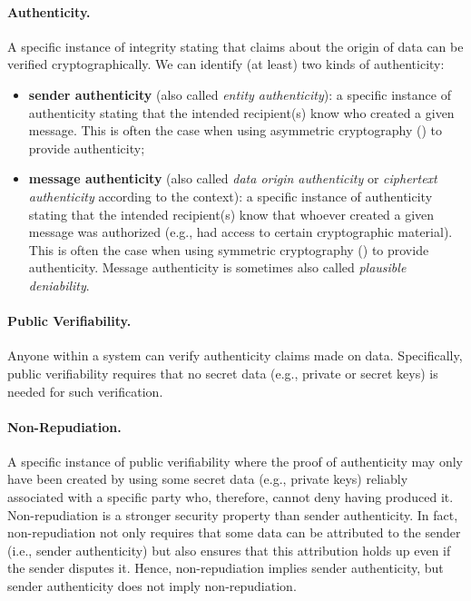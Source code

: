 \paragraph*{Authenticity.} A specific instance of integrity stating that claims about the origin of data can be verified cryptographically. We can identify (at least) two kinds of authenticity:
\begin{itemize}
	\item \textbf{sender authenticity} (also called \textit{entity authenticity}): a specific instance of authenticity stating that the intended recipient(s) know who created a given message. This is often the case when using asymmetric cryptography () to provide authenticity;
	\item \textbf{message authenticity} (also called \textit{data origin authenticity} or \textit{ciphertext authenticity} according to the context): a specific instance of authenticity stating that the intended recipient(s) know that whoever created a given message was authorized (e.g., had access to certain cryptographic material). This is often the case when using symmetric cryptography () to provide authenticity. Message authenticity is sometimes also called \textit{plausible deniability}.
\end{itemize}


\paragraph*{Public Verifiability.} Anyone within a system can verify authenticity claims made on data. Specifically, public verifiability requires that no secret data (e.g., private or secret keys) is needed for such verification.

\paragraph*{Non-Repudiation.} A specific instance of public verifiability where the proof of authenticity may only have been created by using some secret data (e.g., private keys) reliably associated with a specific party who, therefore, cannot deny having produced it. Non-repudiation is a stronger security property than sender authenticity. In fact, non-repudiation not only requires that some data can be attributed to the sender (i.e., sender authenticity) but also ensures that this attribution holds up even if the sender disputes it. Hence, non-repudiation implies sender authenticity, but sender authenticity does not imply non-repudiation.

